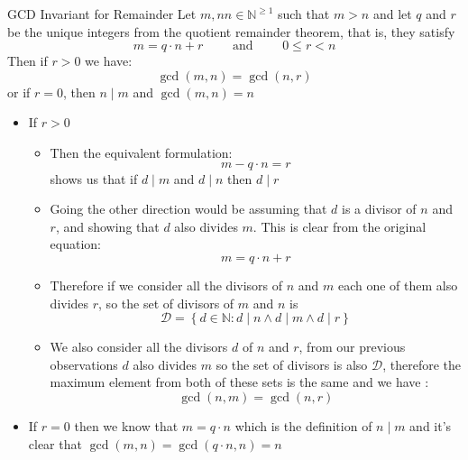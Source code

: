 \documentclass{standalone}
\begin{document}
\begin{deduction*}{GCD Invariant for Remainder}
  Let $ m,nn \in \mathbb{N} ^{\ge 1}$ such that $ m > n$ and let $ q$ and $ r$ be the unique integers from the quotient remainder theorem, that is, they satisfy
  \[
    m =  q  \cdot n  +  r \qquad \text{ and } \qquad 0 \le r < n
  \]
  Then if $ r > 0$ we have:
  \[
  \gcd(m,n) = \gcd(n,r)
  \]
  or if $ r = 0$, then $ n \mid m$ and $ \gcd(m,n)= n$ 
  \begin{pf}
    \begin{itemize}
      \item If $ r > 0$ 
        \begin{itemize}
          \item Then the equivalent formulation:
            \[
            m - q  \cdot n =  r
            \]
          shows us that if $ d \mid m$ and $ d \mid n$ then $ d \mid r$
          \item Going the other direction would be assuming that $ d$ is a divisor of $ n$ and $ r$, and showing that $ d$ also divides $ m$. This is clear from the original equation:
            \[
              m = q  \cdot  n  +  r
            \]
          \item Therefore if we consider all the divisors of $n$ and $m$ each one of them also divides $r$, so the set of divisors of $m$ and $n$ is  
            \[
              \mathcal{D}=\left\{ d \in \mathbb{N}: d \mid n \land d \mid m \land d \mid r \right\}
            \]
          \item We also consider all the divisors $d$ of $n$ and $r$, from our previous observations $d$ also divides $m$ so the set of divisors is also $\mathcal{D}$, therefore the maximum element from both of these sets is the same and we have :
            \[
              \gcd(n,m)=\gcd(n,r)
            \]

        \end{itemize}
        \item If $ r =  0$ then we know that $ m = q  \cdot n$ which is the definition of $ n \mid m$ and it's clear that $ \gcd(m, n) = \gcd(q  \cdot n, n) =  n$ 
    \end{itemize}
  \end{pf}
\end{deduction*}
\end{document}
